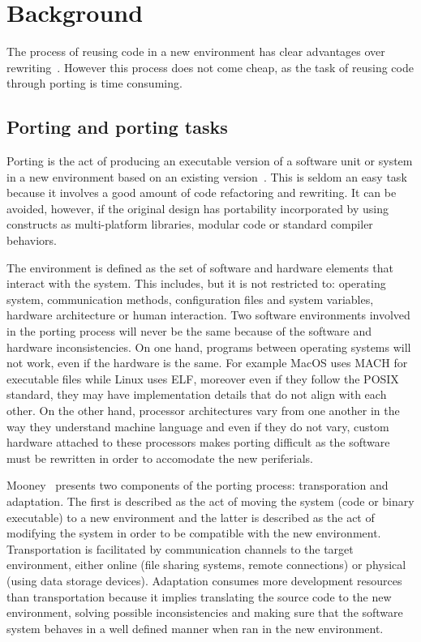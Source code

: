 \chapter{Background} \label{sec:background}

The process of reusing code in a new environment has clear advantages over
rewriting~\cite{frakes1995sixteen}. However this process does not come cheap, as
the task of reusing code through porting is time consuming.

\section{Porting and porting tasks}

Porting is the act of producing an executable version of a software unit or
system in a new environment based on an existing
version~\cite{mooney1990strategies}. This is
seldom an easy task because it involves a good amount of code refactoring and
rewriting. It can be avoided, however, if the original design has portability
incorporated by using constructs as multi-platform libraries, modular code or
standard compiler behaviors.

The environment is defined as the set of software and hardware elements that
interact with the system. This includes, but it is not restricted to: operating
system, communication methods, configuration files and system variables,
hardware architecture or human interaction. Two software environments involved
in the porting process will never be the same because of the software and
hardware inconsistencies. On one hand, programs between operating systems will
not work, even if the hardware is the same. For example MacOS uses MACH for
executable files while Linux uses ELF, moreover even if they follow the POSIX
standard, they may have implementation details that do not align with each
other. On the other hand, processor architectures vary from one another in the
way they understand machine language and even if they do not vary, custom
hardware attached to these processors makes porting difficult as the software
must be rewritten in order to accomodate the new periferials.

Mooney~\cite{mooney1990strategies} presents two components of the porting process:
transporation and adaptation. The first is described as the act of moving the
system (code or binary executable) to a new environment and the latter is
described as the act of modifying the system in order to be compatible with the
new environment. Transportation is facilitated by communication channels to the
target environment, either online (file sharing systems, remote connections) or
physical (using data storage devices). Adaptation consumes more development
resources than transportation because it implies translating the source code to
the new environment, solving possible inconsistencies and making sure that the
software system behaves in a well defined manner when ran in the new
environment.

